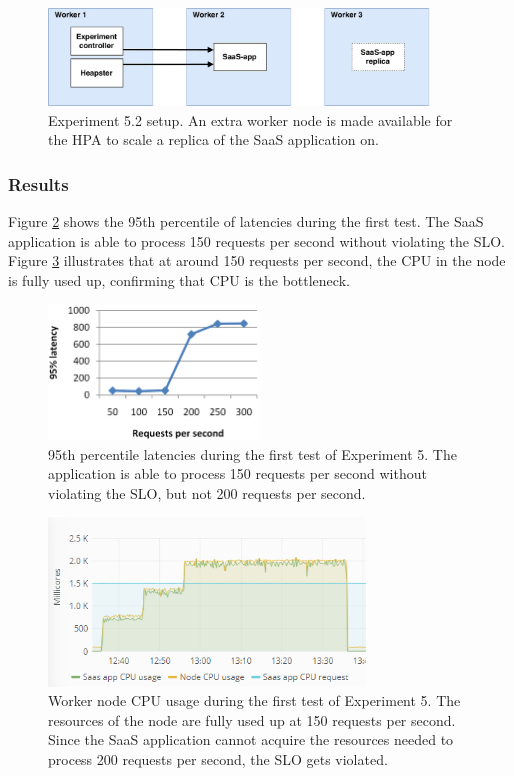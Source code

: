 \setlength\abovecaptionskip{3pt}
\begin{figure}[h]
\centering
\includegraphics[width=0.9\textwidth]{Images/Experiments/Experiment_3_SaaS.pdf}
\caption{Experiment 5.2 setup. An extra worker node is made available for the HPA to scale a replica of the SaaS application on.}
\label{fig:experiment5.2}
\end{figure}


\subsubsection{Results}
Figure \ref{fig:lat-saas-li} shows the 95th percentile of latencies during the first test. The SaaS application is able to process 150 requests per second without violating the SLO. Figure \ref{fig:cpu-saas-li} illustrates that at around 150 requests per second, the CPU in the node is fully used up, confirming that CPU is the bottleneck. 

\setlength\abovecaptionskip{3pt}
\begin{figure}[h]
\centering
\includegraphics[width=0.50\textwidth]{Images/Experiments/CPU/Latencies/lat-saas-li.PNG}
\caption{95th percentile latencies during the first test of Experiment 5. The application is able to process 150 requests per second without violating the SLO, but not 200 requests per second.}
\label{fig:lat-saas-li}
\end{figure}

\setlength\abovecaptionskip{3pt}
\begin{figure}[h]
\centering
\includegraphics[width=0.75\textwidth]{Images/Experiments/CPU/Grafana/cpu-saas-li.PNG}
\caption{Worker node CPU usage during the first test of Experiment 5. The resources of the node are fully used up at 150 requests per second. Since the SaaS application cannot acquire the resources needed to process 200 requests per second, the SLO gets violated.}
\label{fig:cpu-saas-li}
\end{figure}


